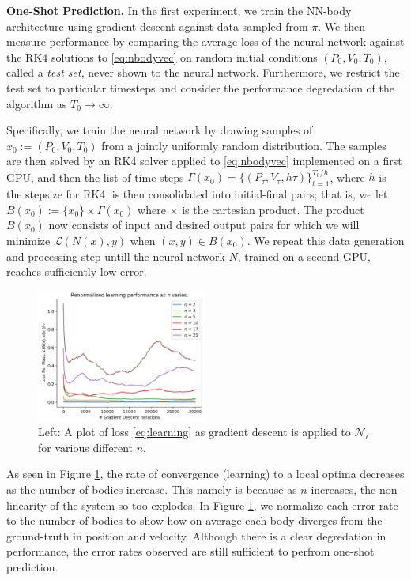 \documentclass{article}
\numberwithin{theorem}{section}
\numberwithin{equation}{section}
\def\scriptl{{\mathcal L}}
\def\scriptn{{\mathcal N}}
\begin{document}
 \textbf{One-Shot Prediction.} In the first experiment, we train the NN-body architecture using gradient descent against data sampled from $\pi.$ We then measure performance by comparing the average loss of the neural network against the RK4 solutions to \eqref{eq:nbodyvec} on random initial conditions $(P_0, V_0, T_0),$ called a \emph{test set}, never shown to the neural network. Furthermore, we restrict the test set to particular timesteps and consider the performance degredation of the algorithm as $T_0 \to \infty.$ 

 Specifically, we train the neural network by drawing samples of $x_0 := (P_0, V_0, T_0)$ from a jointly uniformly random distribution. The samples are then solved by an RK4 solver applied to \eqref{eq:nbodyvec} implemented on a first GPU, and then the list of time-steps $\Gamma(x_0) = \{(P_\tau, V_\tau, h\tau)\}_{t=1}^{T_0/h}$, where $h$ is the stepsize for RK4, is then consolidated into initial-final pairs; that is, we let $B(x_0) := \{x_0\} \times \Gamma(x_0)$ where $\times$ is the cartesian product. The product $B(x_0)$ now consists of input and desired output pairs for which we will minimize $\scriptl(N(x), y)$ when $(x,y) \in B(x_0)$. We repeat this data generation and processing step untill the neural network $N$, trained on a second GPU, reaches sufficiently low error.


\begin{figure}
\vspace{-21pt}
  \begin{center}
    \includegraphics[width=0.5\textwidth]{renormalized.png}
  \end{center}
  \label{fig:renormal}
  \caption{Left: A plot of loss \eqref{eq:learning} as gradient descent is applied to $\scriptn_\ell$ for various different $n$.}
  \vspace{25pt}
\end{figure}

 As seen in Figure \ref{fig:renormal}, the rate of convergence (learning) to a local optima decreases as the number of bodies increase. This namely is because as $n$ increases, the non-linearity of the system so too explodes. In Figure \ref{fig:renormal}, we normalize each error rate to the number of bodies to show how on average each body diverges from the ground-truth in position and velocity. Although there is a clear degredation in performance, the error rates observed are still sufficient to  perfrom one-shot prediction.
\end{document}
